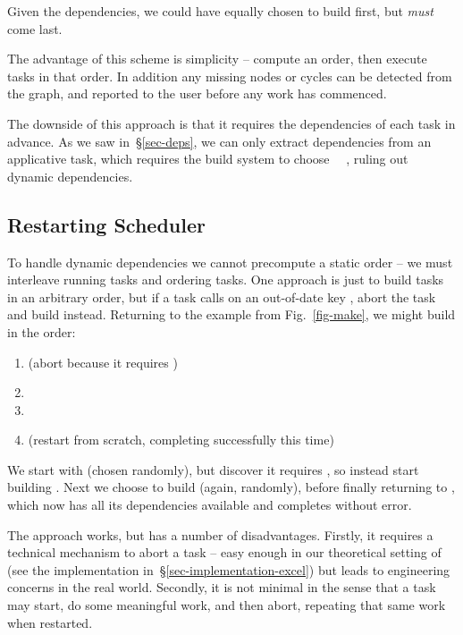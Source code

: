 \noindent
Given the dependencies, we could have equally chosen to build 
first, but  \emph{must} come last.

The advantage of this scheme is simplicity -- compute an order, then execute
tasks in that order. In addition any missing nodes or cycles can be detected
from the graph, and reported to the user before any work has commenced.

The downside of this approach is that it requires the dependencies of each task
in advance. As we saw in~\S\ref{sec-deps}, we can only extract dependencies from
an applicative task, which requires the build system to choose
~\hs{=}~, ruling out dynamic dependencies.

\subsection{Restarting Scheduler}\label{sec-restarting}

To handle dynamic dependencies we cannot precompute a static order -- we must
interleave running tasks and ordering tasks. One approach is just to build tasks
in an arbitrary order, but if a task calls  on an out-of-date key
, abort the task and build  instead. Returning to the example
from Fig.~\ref{fig-make}, we might build in the order:

\begin{enumerate}
\item {} (abort because it requires )
\item {}
\item {}
\item {} (restart from scratch, completing successfully this time)
\end{enumerate}

\noindent
We start with  (chosen randomly), but discover it requires
, so instead start building . Next we choose to build
 (again, randomly), before finally returning to ,
which now has all its dependencies available and completes without error.

The approach works, but has a number of disadvantages. Firstly, it requires a
technical mechanism to abort a task -- easy enough in our theoretical setting of
 (see the implementation in~\S\ref{sec-implementation-excel}) but leads
to engineering concerns in the real world. Secondly, it is not minimal in the
sense that a task may start, do some meaningful work, and then abort, repeating
that same work when restarted.

